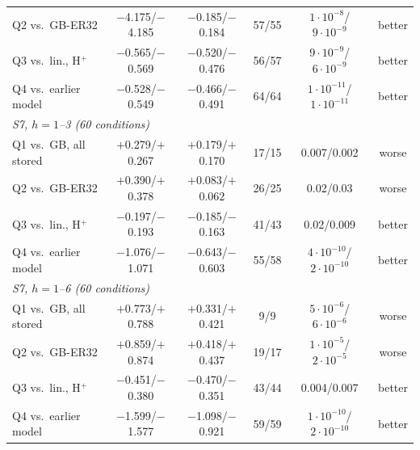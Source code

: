\documentclass[conference]{IEEEtran}
\begin{document}
\begin{table}[t]
\begin{tabular}{lccccc}
    Q2 vs.\ GB-ER32 & $-$4.175/$-$4.185 & $-$0.185/$-$0.184 & 57/55 & $1\cdot10^{-8}$/$9\cdot10^{-9}$ & better \\
    Q3 vs.\ lin., H$^+$ & $-$0.565/$-$0.569 & $-$0.520/$-$0.476 & 56/57 & $9\cdot10^{-9}$/$6\cdot10^{-9}$ & better \\
    Q4 vs.\ earlier model & $-$0.528/$-$0.549 & $-$0.466/$-$0.491 & 64/64 & $1\cdot10^{-11}$/$1\cdot10^{-11}$ & better \\
    \multicolumn{6}{l}{\emph{S7, $h{=}1$--3 (60 conditions)}} \\
    Q1 vs.\ GB, all stored & $+$0.279/$+$0.267 & $+$0.179/$+$0.170 & 17/15 & 0.007/0.002 & worse \\
    Q2 vs.\ GB-ER32 & $+$0.390/$+$0.378 & $+$0.083/$+$0.062 & 26/25 & 0.02/0.03 & worse \\
    Q3 vs.\ lin., H$^+$ & $-$0.197/$-$0.193 & $-$0.185/$-$0.163 & 41/43 & 0.02/0.009 & better \\
    Q4 vs.\ earlier model & $-$1.076/$-$1.071 & $-$0.643/$-$0.603 & 55/58 & $4\cdot10^{-10}$/$2\cdot10^{-10}$ & better \\
    \multicolumn{6}{l}{\emph{S7, $h{=}1$--6 (60 conditions)}} \\
    Q1 vs.\ GB, all stored & $+$0.773/$+$0.788 & $+$0.331/$+$0.421 & 9/9 & $5\cdot10^{-6}$/$6\cdot10^{-6}$ & worse \\
    Q2 vs.\ GB-ER32 & $+$0.859/$+$0.874 & $+$0.418/$+$0.437 & 19/17 & $1\cdot10^{-5}$/$2\cdot10^{-5}$ & worse \\
    Q3 vs.\ lin., H$^+$ & $-$0.451/$-$0.380 & $-$0.470/$-$0.351 & 43/44 & 0.004/0.007 & better \\
    Q4 vs.\ earlier model & $-$1.599/$-$1.577 & $-$1.098/$-$0.921 & 59/59 & $1\cdot10^{-10}$/$2\cdot10^{-10}$ & better \\
    \bottomrule
  \end{tabular}
\end{table}
\end{document}
